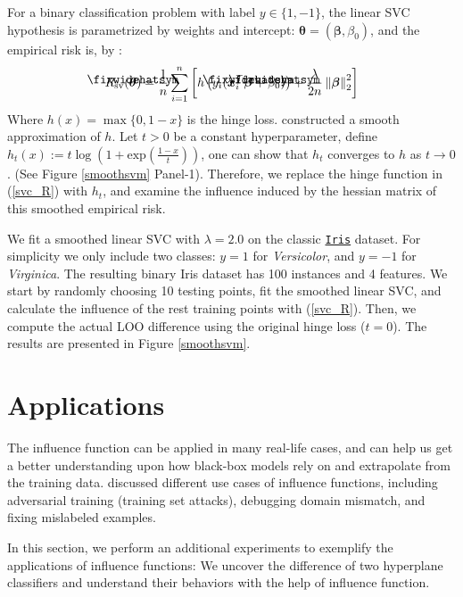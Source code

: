 \documentclass{article}
\newcommand\lowerwidehatsym{%
  \text{\smash{\raisebox{-1.3ex}{%
    $\fixwidehatsym$}}}}
\newcommand\fixwidehat[1]{%
  \mathchoice
    {\accentset{\displaystyle\lowerwidehatsym}{#1}}
    {\accentset{\textstyle\lowerwidehatsym}{#1}}
    {\accentset{\scriptstyle\lowerwidehatsym}{#1}}
    {\accentset{\scriptscriptstyle\lowerwidehatsym}{#1}}
}
\begin{document}
For a binary classification problem with label $y\in\{1,-1\}$, the linear SVC hypothesis is parametrized by weights and intercept: $\bm{\theta} = (\bm{\beta}, \beta_0)$, and the empirical risk is, by \cite{ESL}:
\begin{align}\label{svc_R}
\vspace{-0.2in}
R_{\text{sv}}(\fixwidehat{\bm{\theta}}) = \frac{1}{n}\sum_{i=1}^n \left[h\left(y_i(\bm{x}_i^{\top} \fixwidehat{\bm{\beta}} + \fixwidehat{\beta_0})\right) + \frac{\lambda}{2n} \left\lVert \bm{\beta}\right\rVert_2^2\right]
\vspace{-0.2in}
\end{align}
Where $h(x) = \max\{0, 1-x\}$ is the hinge loss. \cite{koh2017} constructed a smooth approximation of $h$. Let $t>0$ be a constant hyperparameter, define $h_t(x) := t\log(1+\text{exp}(\frac{1-x}{t}))$, one can show that $h_t$ converges to $h$ as $t\to 0$. (See Figure \ref{smoothsvm} Panel-1). Therefore, we replace the hinge function in (\ref{svc_R}) with $h_t$, and examine the influence induced by the hessian matrix of this smoothed empirical risk.

We fit a smoothed linear SVC with $\lambda = 2.0$ on the classic \href{https://archive.ics.uci.edu/ml/datasets/iris}{\texttt{Iris}} dataset. For simplicity we only include two classes: $y=1$ for \emph{Versicolor}, and $y=-1$ for \emph{Virginica}. The resulting binary Iris dataset has 100 instances and 4 features. We start by randomly choosing 10 testing points, fit the smoothed linear SVC, and calculate the influence of the rest training points with (\ref{svc_R}). Then, we compute the actual LOO difference using the original hinge loss ($t=0$). The results are presented in Figure \ref{smoothsvm}. 


\section{Applications}
The influence function can be applied in many real-life cases, and can help us get a better understanding upon how black-box models rely on and extrapolate from the training data. \cite{koh2017} discussed different use cases of influence functions, including adversarial training (training set attacks), debugging domain mismatch, and fixing mislabeled examples.

In this section, we perform an additional experiments to exemplify the applications of influence functions: We uncover the difference of two hyperplane classifiers and understand their behaviors with the help of influence function. 
\end{document}
